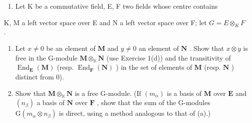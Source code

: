 \begin{enumerate}
\def\labelenumi{\arabic{enumi}.}
\setcounter{enumi}{1}
\tightlist
\item
  Let K be a commutative field, E, F two fields whose centre contains
\end{enumerate}

K, M a left vector space over E and N a left vector space over F; let \(G = E \otimes_{K} F\) .

\begin{enumerate}
\def\labelenumi{(\alph{enumi})}
\item
  Let \(x \neq 0\) be an element of \(\mathbf{M}\) and \(y \neq 0\) an element of \(\mathbf{N}\) . Show that \(x \otimes y\) is free in the G-module \(\mathbf{M} \otimes_{\mathbb{K}} \mathbf{N}\) (use Exercise 1(d)) and the transitivity of \(\operatorname{End}_{\mathbf{E}}(\mathbf{M})\) (resp. \(\operatorname{End}_{\mathbf{F}}(\mathbf{N})\) ) in the set of elements of \(\mathbf{M}\) (resp. \(\mathbf{N}\) ) distinct from 0).
\item
  Show that \(\mathbf{M} \otimes_{\mathbb{K}} \mathbf{N}\) is a free G-module. (If \((m_{\alpha})\) is a basis of \(\mathbf{M}\) over \(\mathbf{E}\) and \((n_{\beta})\) a basis of \(\mathbf{N}\) over \(\mathbf{F}\) , show that the sum of the G-modules \(\mathrm{G}(m_{\alpha} \otimes n_{\beta})\) is direct, using a method analogous to that of (a).)
\end{enumerate}

\BourbakiExercisesSection

